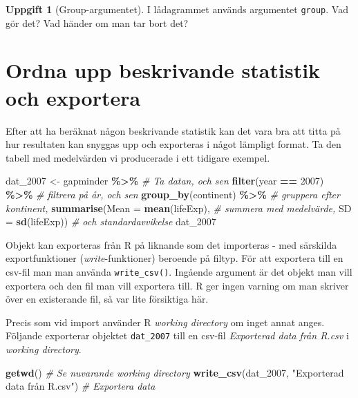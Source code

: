 \documentclass[
]{book}
\newenvironment{Shaded}{\begin{snugshade}}{\end{snugshade}}
\newcommand{\AttributeTok}[1]{\textcolor[rgb]{0.13,0.29,0.53}{#1}}
\newcommand{\CommentTok}[1]{\textcolor[rgb]{0.56,0.35,0.01}{\textit{#1}}}
\newcommand{\DecValTok}[1]{\textcolor[rgb]{0.00,0.00,0.81}{#1}}
\newcommand{\FunctionTok}[1]{\textcolor[rgb]{0.13,0.29,0.53}{\textbf{#1}}}
\newcommand{\NormalTok}[1]{#1}
\newcommand{\OtherTok}[1]{\textcolor[rgb]{0.56,0.35,0.01}{#1}}
\newcommand{\SpecialCharTok}[1]{\textcolor[rgb]{0.81,0.36,0.00}{\textbf{#1}}}
\newcommand{\StringTok}[1]{\textcolor[rgb]{0.31,0.60,0.02}{#1}}
\theoremstyle{definition}
\theoremstyle{definition}
\theoremstyle{definition}
\newtheorem{exercise}{Uppgift}[chapter]
\theoremstyle{definition}
\theoremstyle{remark}
\begin{document}
\begin{exercise}[Group-argumentet]
I lådagrammet används argumentet \texttt{group}. Vad gör det? Vad händer om man tar bort det?
\end{exercise}

\section{Ordna upp beskrivande statistik och exportera}\label{ordna-upp-beskrivande-statistik-och-exportera}

Efter att ha beräknat någon beskrivande statistik kan det vara bra att titta på hur resultaten kan snyggas upp och exporteras i något lämpligt format. Ta den tabell med medelvärden vi producerade i ett tidigare exempel.

\begin{Shaded}
\begin{Highlighting}[]
\NormalTok{dat\_2007 }\OtherTok{\textless{}{-}}\NormalTok{ gapminder }\SpecialCharTok{\%\textgreater{}\%}         \CommentTok{\# Ta datan, och sen}
  \FunctionTok{filter}\NormalTok{(year }\SpecialCharTok{==} \DecValTok{2007}\NormalTok{) }\SpecialCharTok{\%\textgreater{}\%}        \CommentTok{\# filtrera på år, och sen}
  \FunctionTok{group\_by}\NormalTok{(continent) }\SpecialCharTok{\%\textgreater{}\%}         \CommentTok{\# gruppera efter kontinent,}
  \FunctionTok{summarise}\NormalTok{(}\AttributeTok{Mean =} \FunctionTok{mean}\NormalTok{(lifeExp), }\CommentTok{\# summera med medelvärde,}
            \AttributeTok{SD =} \FunctionTok{sd}\NormalTok{(lifeExp))     }\CommentTok{\# och standardavvikelse}
\NormalTok{dat\_2007}
\end{Highlighting}
\end{Shaded}

Objekt kan exporteras från R på liknande som det importeras - med särskilda exportfunktioner (\emph{write}-funktioner) beroende på filtyp. För att exportera till en csv-fil man man använda \texttt{write\_csv()}. Ingående argument är det objekt man vill exportera och den fil man vill exportera till. R ger ingen varning om man skriver över en existerande fil, så var lite försiktiga här.

Precis som vid import använder R \emph{working directory} om inget annat anges. Följande exporterar objektet \texttt{dat\_2007} till en csv-fil \emph{Exporterad data från R.csv} i \emph{working directory}.

\begin{Shaded}
\begin{Highlighting}[]
\FunctionTok{getwd}\NormalTok{()                          }\CommentTok{\# Se nuvarande working directory}
\FunctionTok{write\_csv}\NormalTok{(dat\_2007, }\StringTok{"Exporterad data från R.csv"}\NormalTok{) }\CommentTok{\# Exportera data}
\end{Highlighting}
\end{Shaded}
\end{document}
